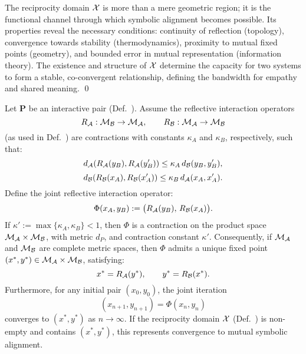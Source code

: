 \begin{scholium}
\label{scholium:bk7_reciprocity_as_symbolic_alignment_channel}
The reciprocity domain $\mathcal{X}$ is more than a mere geometric region; it is the functional channel through which symbolic alignment becomes possible. Its properties reveal the necessary conditions: continuity of reflection (topology), convergence towards stability (thermodynamics), proximity to mutual fixed points (geometry), and bounded error in mutual representation (information theory). The existence and structure of $\mathcal{X}$ determine the capacity for two systems to form a stable, co-convergent relationship, defining the bandwidth for empathy and shared meaning. \qed
{}
\end{scholium}
\begin{theorem}
\label{theorem:bk7_two_way_street_convergence}
Let \( \mathbf{P} \) be an interactive pair (Def.~). 
Assume the reflective interaction operators
\[
R_{\mathcal{A}} : \mathcal{M}_{\mathcal{B}} \to \mathcal{M}_{\mathcal{A}}, 
\qquad
R_{\mathcal{B}} : \mathcal{M}_{\mathcal{A}} \to \mathcal{M}_{\mathcal{B}}
\]
(as used in Def.~) are contractions with constants \( \kappa_A \) and \( \kappa_B \), respectively, such that:
\[
d_{\mathcal{A}}(R_{\mathcal{A}}(y_B), R_{\mathcal{A}}(y'_B)) 
\le \kappa_A\, d_{\mathcal{B}}(y_B, y'_B),
\]
\[
d_{\mathcal{B}}(R_{\mathcal{B}}(x_A), R_{\mathcal{B}}(x'_A)) 
\le \kappa_B\, d_{\mathcal{A}}(x_A, x'_A).
\]
Define the joint reflective interaction operator:
\[
\Phi(x_A, y_B) := 
\big( R_{\mathcal{A}}(y_B),\, R_{\mathcal{B}}(x_A) \big).
\]
If \( \kappa' := \max\{ \kappa_A, \kappa_B \} < 1 \), then \( \Phi \) is a contraction 
on the product space \( \mathcal{M}_{\mathcal{A}} \times \mathcal{M}_{\mathcal{B}} \), 
with metric \( d_P \), and contraction constant \( \kappa' \).
Consequently, if \( \mathcal{M}_{\mathcal{A}} \) and \( \mathcal{M}_{\mathcal{B}} \) are complete metric spaces, 
then \( \Phi \) admits a unique fixed point \( (x^{\ast}, y^{\ast}) \in \mathcal{M}_{\mathcal{A}} \times \mathcal{M}_{\mathcal{B}} \), satisfying:
\[
x^{\ast} = R_{\mathcal{A}}(y^{\ast}), 
\qquad 
y^{\ast} = R_{\mathcal{B}}(x^{\ast}).
\]
Furthermore, for any initial pair \( (x_0, y_0) \), 
the joint iteration 
\[
(x_{n+1}, y_{n+1}) = \Phi(x_n, y_n)
\]
converges to \( (x^{\ast}, y^{\ast}) \) as \( n \to \infty \).
If the reciprocity domain \( \mathcal{X} \) (Def.~) 
is non-empty and contains \( (x^{\ast}, y^{\ast}) \), 
this represents convergence to mutual symbolic alignment.
\end{theorem}
